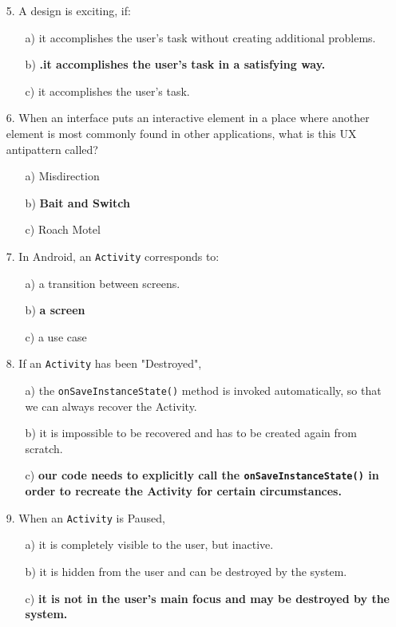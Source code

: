 \documentclass[12pt]{article}
\begin{document}
\begin{itemize}
    \item[5.] A design is exciting, if:
    \begin{itemize}
        \item[a)] it accomplishes the user's task without creating additional problems.
        \item[b)] \textbf{.it accomplishes the user's task in a satisfying way.}
        \item[c)] it accomplishes the user's task.
    \end{itemize}
    
    \item[6.] When an interface puts an interactive element in a place where another element is most commonly found in other applications, what is this UX antipattern called?
    \begin{itemize}
        \item[a)] Misdirection
        \item[b)] \textbf{Bait and Switch}
        \item[c)] Roach Motel
    \end{itemize}
    
    \item[7.] In Android, an \texttt{Activity} corresponds to:
    \begin{itemize}
        \item[a)] a transition between screens.
        \item[b)] \textbf{a screen}
        \item[c)] a use case
    \end{itemize}
    
    \item[8.] If an \texttt{Activity} has been "Destroyed",
    \begin{itemize}
        \item[a)] the \texttt{onSaveInstanceState()} method is invoked automatically, so that we can always recover the Activity.
        \item[b)] it is impossible to be recovered and has to be created again from scratch.
        \item[c)] \textbf{our code needs to explicitly call the \texttt{onSaveInstanceState()} in order to recreate the Activity for certain circumstances.}
    \end{itemize}
    
    \item[9.] When an \texttt{Activity} is Paused,
    \begin{itemize}
        \item[a)] it is completely visible to the user, but inactive.
        \item[b)] it is hidden from the user and can be destroyed by the system.
        \item[c)] \textbf{it is not in the user's main focus and may be destroyed by the system.}
    \end{itemize}
    

\end{itemize}
\end{document}
